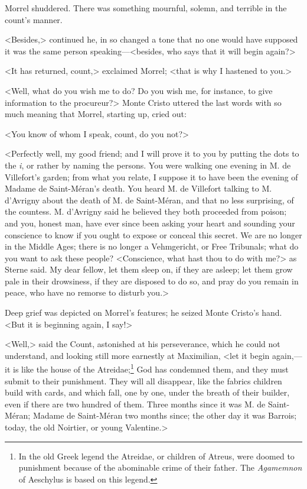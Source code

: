  Morrel shuddered. There was something mournful, solemn, and terrible in the count's manner. 

 <Besides,> continued he, in so changed a tone that no one would have supposed it was the same person speaking—<besides, who says that it will begin again?> 

 <It has returned, count,> exclaimed Morrel; <that is why I hastened to you.> 

 <Well, what do you wish me to do? Do you wish me, for instance, to give information to the procureur?> Monte Cristo uttered the last words with so much meaning that Morrel, starting up, cried out: 

 <You know of whom I speak, count, do you not?> 

 <Perfectly well, my good friend; and I will prove it to you by putting the dots to the \textit{i}, or rather by naming the persons. You were walking one evening in M. de Villefort's garden; from what you relate, I suppose it to have been the evening of Madame de Saint-Méran's death. You heard M. de Villefort talking to M. d'Avrigny about the death of M. de Saint-Méran, and that no less surprising, of the countess. M. d'Avrigny said he believed they both proceeded from poison; and you, honest man, have ever since been asking your heart and sounding your conscience to know if you ought to expose or conceal this secret. We are no longer in the Middle Ages; there is no longer a Vehmgericht, or Free Tribunals; what do you want to ask these people? <Conscience, what hast thou to do with me?> as Sterne said. My dear fellow, let them sleep on, if they are asleep; let them grow pale in their drowsiness, if they are disposed to do so, and pray do you remain in peace, who have no remorse to disturb you.> 

 Deep grief was depicted on Morrel's features; he seized Monte Cristo's hand. <But it is beginning again, I say!> 

 <Well,> said the Count, astonished at his perseverance, which he could not understand, and looking still more earnestly at Maximilian, <let it begin again,—it is like the house of the Atreidae;\footnote{In the old Greek legend the Atreidae, or children of Atreus, were doomed to punishment because of the abominable crime of their father. The \textit{Agamemnon} of Aeschylus is based on this legend.} God has condemned them, and they must submit to their punishment. They will all disappear, like the fabrics children build with cards, and which fall, one by one, under the breath of their builder, even if there are two hundred of them. Three months since it was M. de Saint-Méran; Madame de Saint-Méran two months since; the other day it was Barrois; today, the old Noirtier, or young Valentine.> 


